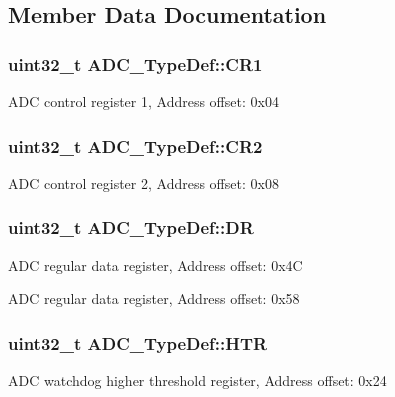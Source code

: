\subsection{Member Data Documentation}
\hypertarget{struct_a_d_c___type_def_a89b1ff4376683dd2896ea8b32ded05b2}{
\subsubsection[{C\-R1}]{ uint32\-\_\-t A\-D\-C\-\_\-\-Type\-Def\-::\-C\-R1}}\label{struct_a_d_c___type_def_a89b1ff4376683dd2896ea8b32ded05b2}
A\-D\-C control register 1, Address offset\-: 0x04 \hypertarget{struct_a_d_c___type_def_a1053a65a21af0d27afe1bf9cf7b7aca7}{
\subsubsection[{C\-R2}]{ uint32\-\_\-t A\-D\-C\-\_\-\-Type\-Def\-::\-C\-R2}}\label{struct_a_d_c___type_def_a1053a65a21af0d27afe1bf9cf7b7aca7}
A\-D\-C control register 2, Address offset\-: 0x08 \hypertarget{struct_a_d_c___type_def_a84114accead82bd11a0e12a429cdfed9}{
\subsubsection[{D\-R}]{ uint32\-\_\-t A\-D\-C\-\_\-\-Type\-Def\-::\-D\-R}}\label{struct_a_d_c___type_def_a84114accead82bd11a0e12a429cdfed9}
A\-D\-C regular data register, Address offset\-: 0x4\-C

A\-D\-C regular data register, Address offset\-: 0x58 \hypertarget{struct_a_d_c___type_def_a297ac2d83a1837bfdc0333474b977de0}{
\subsubsection[{H\-T\-R}]{ uint32\-\_\-t A\-D\-C\-\_\-\-Type\-Def\-::\-H\-T\-R}}\label{struct_a_d_c___type_def_a297ac2d83a1837bfdc0333474b977de0}
A\-D\-C watchdog higher threshold register, Address offset\-: 0x24

